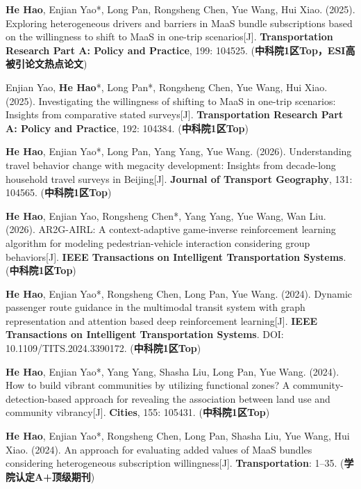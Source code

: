 \begin{enumerate}[leftmargin=*, parsep=5pt, label={[\arabic*]}]

	\item \textbf{He Hao}, Enjian Yao*, Long Pan, Rongsheng Chen, Yue Wang, Hui Xiao. (2025). Exploring heterogeneous drivers and barriers in MaaS bundle subscriptions based on the willingness to shift to MaaS in one-trip scenarios[J]. \textbf{Transportation Research Part A: Policy and Practice}, 199: 104525. (\textbf{中科院1区Top，ESI高被引论文热点论文})

	\item Enjian Yao, \textbf{He Hao}*, Long Pan*, Rongsheng Chen, Yue Wang, Hui Xiao. (2025). Investigating the willingness of shifting to MaaS in one-trip scenarios: Insights from comparative stated surveys[J]. \textbf{Transportation Research Part A: Policy and Practice}, 192: 104384. (\textbf{中科院1区Top})

	\item \textbf{He Hao}, Enjian Yao*, Long Pan, Yang Yang, Yue Wang. (2026). Understanding travel behavior change with megacity development: Insights from decade-long household travel surveys in Beijing[J]. \textbf{Journal of Transport Geography}, 131: 104565. (\textbf{中科院1区Top})

	\item \textbf{He Hao}, Enjian Yao, Rongsheng Chen*, Yang Yang, Yue Wang, Wan Liu. (2026). AR2G-AIRL: A context-adaptive game-inverse reinforcement learning algorithm for modeling pedestrian-vehicle interaction considering group behaviors[J]. \textbf{IEEE Transactions on Intelligent Transportation Systems}. (\textbf{中科院1区Top})

	\item \textbf{He Hao}, Enjian Yao*, Rongsheng Chen, Long Pan, Yue Wang. (2024). Dynamic passenger route guidance in the multimodal transit system with graph representation and attention based deep reinforcement learning[J]. \textbf{IEEE Transactions on Intelligent Transportation Systems}. DOI: 10.1109/TITS.2024.3390172. (\textbf{中科院1区Top})

	\item \textbf{He Hao}, Enjian Yao*, Yang Yang, Shasha Liu, Long Pan, Yue Wang. (2024). How to build vibrant communities by utilizing functional zones? A community-detection-based approach for revealing the association between land use and community vibrancy[J]. \textbf{Cities}, 155: 105431. (\textbf{中科院1区Top})

	\item \textbf{He Hao}, Enjian Yao*, Rongsheng Chen, Long Pan, Shasha Liu, Yue Wang, Hui Xiao. (2024). An approach for evaluating added values of MaaS bundles considering heterogeneous subscription willingness[J]. \textbf{Transportation}: 1--35. (\textbf{学院认定A+顶级期刊})


\end{enumerate}
